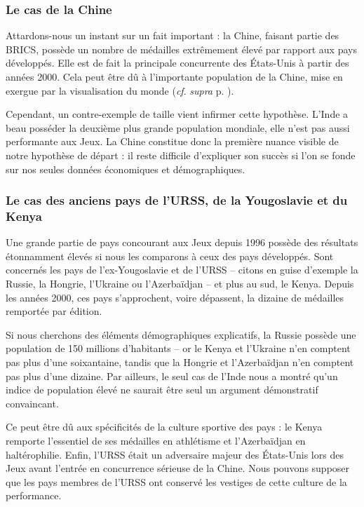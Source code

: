 \documentclass[hidelinks, 12pt]{report}
\begin{document}
\subsubsection{Le cas de la Chine}

Attardons-nous un instant sur un fait important : la Chine, faisant partie des BRICS, possède un nombre de médailles extrêmement élevé par rapport aux pays développés. Elle est de fait la principale concurrente des États-Unis à partir des années 2000. Cela peut être dû à l'importante population de la Chine, mise en exergue par la visualisation du monde (\textit{cf}. \textit{supra} p. \pageref{map}).

Cependant, un contre-exemple de taille vient infirmer cette hypothèse. L'Inde a beau posséder la deuxième plus grande population mondiale, elle n'est pas aussi performante aux Jeux. La Chine constitue donc la première nuance visible de notre hypothèse de départ : il reste difficile d’expliquer son succès si l’on se fonde sur nos seules données économiques et démographiques.

\subsubsection{Le cas des anciens pays de l’URSS, de la Yougoslavie et du Kenya}

Une grande partie de pays concourant aux Jeux depuis 1996 possède des résultats étonnamment élevés si nous les comparons à ceux des pays développés. Sont concernés les pays de l'ex-Yougoslavie et de l'URSS -- citons en guise d'exemple la Russie, la Hongrie, l'Ukraine ou l'Azerbaïdjan -- et plus au sud, le Kenya. Depuis les années 2000, ces pays s'approchent, voire dépassent, la dizaine de médailles remportée par édition. 

Si nous cherchons des éléments démographiques explicatifs, la Russie possède une population de 150 millions d'habitants -- or le Kenya et l'Ukraine n'en comptent pas plus d'une soixantaine, tandis que la Hongrie et l'Azerbaïdjan n'en comptent pas plus d'une dizaine. Par ailleurs, le seul cas de l'Inde nous a montré qu'un indice de population élevé ne saurait être seul un argument démonstratif convaincant.

Ce peut être dû aux spécificités de la culture sportive des pays : le Kenya remporte l'essentiel de ses médailles en athlétisme et l'Azerbaïdjan en haltérophilie. Enfin, l'URSS était un adversaire majeur des États-Unis lors des Jeux avant l'entrée en concurrence sérieuse de la Chine. Nous pouvons supposer que les pays membres de l'URSS ont conservé les vestiges de cette culture de la performance.
\newline
\end{document}
